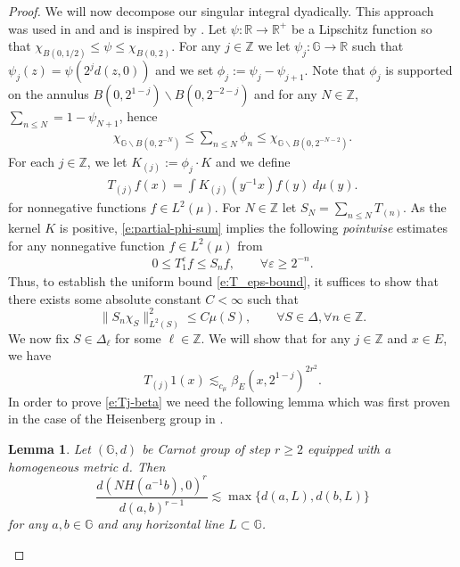 \documentclass[11pt]{amsart}
\newtheorem{lemma}[theorem]{Lemma}
\theoremstyle{definition}
\newcommand{\G}{\mathbb G}
\newcommand{\ve}{\varepsilon}
\newcommand{\Z}{\mathbb{Z}}
\newcommand{\R}{\mathbb R}
\numberwithin{theorem}{section} \numberwithin{equation}{section}
\begin{document}
\begin{proof}
We will now decompose our singular integral dyadically. This approach was used in \cite{CFOsios} and \cite{ChoLi} and is inspired by \cite{tolsaplms}. Let $\psi : \R \to \R^+$ be a Lipschitz function so that $\chi_{B(0,1/2)} \leq \psi \leq \chi_{B(0,2)}$.  For any $j \in \Z$ we let $\psi_j : \G \to \R$  such that $\psi_j(z)=\psi(2^j d(z,0))$ and we set $\phi_j := \psi_j - \psi_{j+1}$.  Note that $\phi_j$ is supported on the annulus $B(0,2^{1-j}) \backslash B(0,2^{-2-j})$ and for any $N \in \Z$, $\sum_{n \leq N}=1-\psi_{N+1}$, hence
\begin{align}
  \chi_{\G \backslash B(0,2^{-N})} \leq \sum_{n \leq N} \phi_n \leq \chi_{\G \backslash B(0,2^{-N-2})}. \label{e:partial-phi-sum}
\end{align}
For each $j \in \Z$, we let $K_{(j)} := \phi_j \cdot K$ and we define 
\begin{align*}
  T_{(j)}f(x) = \int  K_{(j)}(y^{-1}x)f(y) ~d\mu(y).
\end{align*}
for nonnegative functions $f \in L^2(\mu)$. For $N \in \Z$  let $S_N = \sum_{n \leq N} T_{(n)}$.  As the kernel $K$ is positive,  \eqref{e:partial-phi-sum} implies the following {\it pointwise} estimates for any nonnegative function $f \in L^2(\mu)$ from
\begin{align*}
  0 \leq T_1^\ve f \leq S_{n} f, \qquad \forall \ve \geq 2^{-n}.
\end{align*}
Thus, to establish the uniform bound \eqref{e:T_eps-bound}, it suffices to show that there exists some absolute constant $C < \infty$ such that
\begin{equation}
\label{snbound}
  \|S_n \chi_S\|_{L^2(S)}^2 \leq C \mu(S), \qquad \forall S \in \Delta, \forall n \in \Z.
\end{equation}
We now fix $S \in \Delta_\ell$ for some $\ell \in \Z$.  We will show that for any $j \in \Z$ and $x \in E$, we have
  \begin{equation}
\label{e:Tj-beta}
    T_{(j)}1(x) \lesssim_{c_{\mu}} \beta_E(x,2^{1-j})^{2r^2}. 
  \end{equation}
In order to prove \eqref{e:Tj-beta} we need the following lemma which was first proven in the case of the Heisenberg group in \cite[Lemma 3.3]{LiSchul2}.
\begin{lemma}
\label{kernellemma}
Let $(\G,d)$ be Carnot group of step $r\geq 2$ equipped with a homogeneous metric $d$. Then
\begin{equation}
\label{kerneleq}
\frac{d(NH(a^{-1}b),0)^{r}}{d(a,b)^{r-1}} 
\lesssim \max \{ d(a,L),d(b,L) \}
\end{equation}
for any $a,b \in \mathbb{G}$ and any horizontal line $L \subset \mathbb{G}$.
\end{lemma}


\end{proof}
\end{document}
